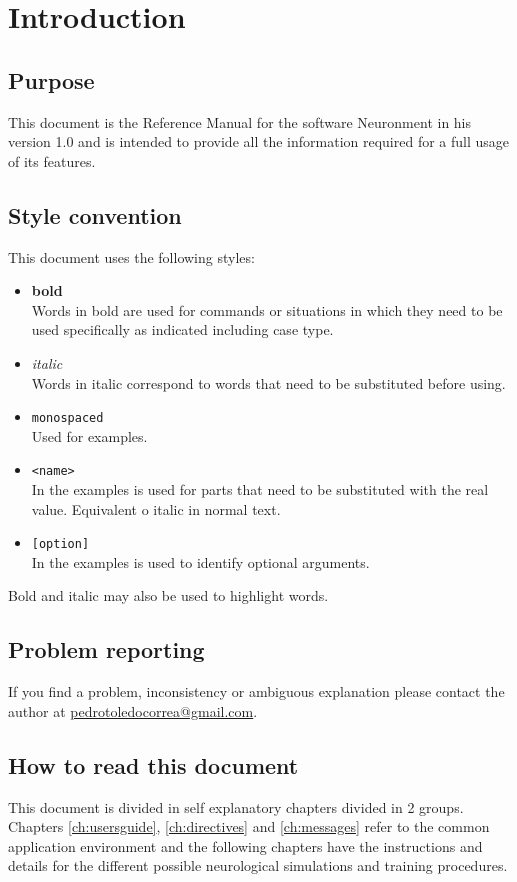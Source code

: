\chapter{Introduction}
\label{ch:introduction}

\section{Purpose}

This document is the Reference Manual for the software Neuronment in his version 1.0 and is intended to provide
all the information required for a full usage of its features.

\section{Style convention}

This document uses the following styles:
\begin{itemize}
  \item \textbf{bold}\\  
  Words in bold are used for commands or situations in which they need to be used specifically as indicated including case type.
  \item \textit{italic}\\  
  Words in italic correspond to words that need to be substituted before using.
  \item \texttt{monospaced}\\  
  Used for examples.
  \item \texttt{<name>}\\  
  In the examples is used for parts that need to be substituted with the real value. Equivalent o italic in normal text.
  \item \texttt{[option]}\\
  In the examples is used to identify optional arguments.
\end{itemize}

Bold and italic may also be used to highlight words.

\section{Problem reporting}

If you find a problem, inconsistency or ambiguous explanation please contact the author at \href{mailto:pedrotoledocorrea@gmail.com}{pedrotoledocorrea@gmail.com}.

\section{How to read this document}

This document is divided in self explanatory chapters divided in 2 groups. Chapters \ref{ch:usersguide}, \ref{ch:directives} and \ref{ch:messages} refer to the common application environment and the following chapters have the instructions and details for the different possible neurological simulations and training procedures.

\newpage